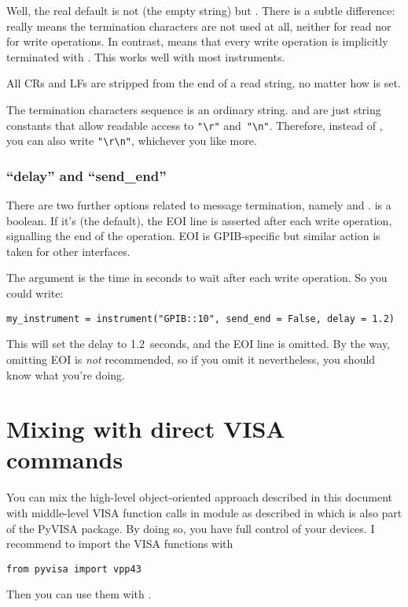 \documentclass{howto}
\begin{document}
Well, the real default is not  (the empty string) but .
There is a subtle difference:  really means the termination characters
are not used at all, neither for read nor for write operations.  In contrast,
 means that every write operation is implicitly terminated with
\@.  This works well with most instruments.

All CRs and LFs are stripped from the end of a read string, no matter how
 is set.

The termination characters sequence is an ordinary string.   and
 are just string constants that allow readable access to \verb|"\r"|
and~\verb|"\n"|.  Therefore, instead of , you can also write
\verb|"\r\n"|, whichever you like more.

\subsubsection{``delay'' and ``send\_end''}

There are two further options related to message termination, namely
 and .   is a boolean.  If it's
 (the default), the EOI line is asserted after each write operation,
signalling the end of the operation.  EOI is GPIB-specific but similar action
is taken for other interfaces.

The argument  is the time in seconds to wait after each write
operation.  So you could write:
\begin{verbatim}
my_instrument = instrument("GPIB::10", send_end = False, delay = 1.2)
\end{verbatim}
This will set the delay to 1.2~seconds, and the EOI line is omitted.  By the
way, omitting EOI is \emph{not} recommended, so if you omit it nevertheless,
you should know what you're doing.


\section{Mixing with direct VISA commands}

You can mix the high-level object-oriented approach described in this document
with middle-level VISA function calls in module  as described in
 which is also part of the PyVISA package.  By doing so, you
have full control of your devices.  I recommend to import the VISA functions
with
\begin{verbatim}
from pyvisa import vpp43
\end{verbatim}
Then you can use them with .
\end{document}
